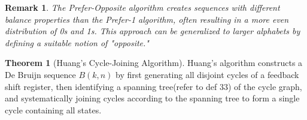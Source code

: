 \documentclass{article}
\newtheorem{remark}{Remark}
\theoremstyle{definition}
\newtheorem{theorem}{Theorem}
\begin{document}
\begin{remark}
The Prefer-Opposite algorithm creates sequences with different balance properties than the Prefer-1 algorithm, often resulting in a more even distribution of 0s and 1s. This approach can be generalized to larger alphabets by defining a suitable notion of "opposite."
\end{remark}
\begin{theorem}[Huang's Cycle-Joining Algorithm]
Huang's algorithm constructs a De Bruijn sequence $B(k, n)$ by first generating all disjoint cycles of a feedback shift register, then identifying a spanning tree(refer to def 33) of the cycle graph, and systematically joining cycles according to the spanning tree to form a single cycle containing all states.
\end{theorem}
\end{document}

